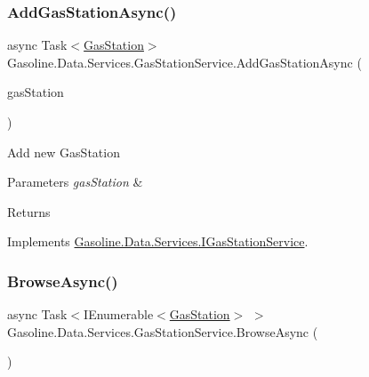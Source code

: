 \subsubsection{\texorpdfstring{AddGasStationAsync()}{AddGasStationAsync()}}
{\footnotesize\ttfamily async Task$<$\mbox{\hyperlink{class_gasoline_1_1_data_1_1_models_1_1_gas_station}{Gas\+Station}}$>$ Gasoline.\+Data.\+Services.\+Gas\+Station\+Service.\+Add\+Gas\+Station\+Async (\begin{DoxyParamCaption}\item[{\mbox{\hyperlink{class_gasoline_1_1_data_1_1_models_1_1_gas_station}{Gas\+Station}}}]{gas\+Station }\end{DoxyParamCaption})}



Add new Gas\+Station 


\begin{DoxyParams}{Parameters}
{\em gas\+Station} & \\
\hline
\end{DoxyParams}
\begin{DoxyReturn}{Returns}

\end{DoxyReturn}


Implements \mbox{\hyperlink{interface_gasoline_1_1_data_1_1_services_1_1_i_gas_station_service_ae0bb2d899701dddd473667980e7533d2}{Gasoline.\+Data.\+Services.\+I\+Gas\+Station\+Service}}.

\mbox{\label{class_gasoline_1_1_data_1_1_services_1_1_gas_station_service_adb5cc988c7237c4019008a3c86bbe25f}} 
\subsubsection{\texorpdfstring{BrowseAsync()}{BrowseAsync()}}
{\footnotesize\ttfamily async Task$<$I\+Enumerable$<$\mbox{\hyperlink{class_gasoline_1_1_data_1_1_models_1_1_gas_station}{Gas\+Station}}$>$ $>$ Gasoline.\+Data.\+Services.\+Gas\+Station\+Service.\+Browse\+Async (\begin{DoxyParamCaption}{ }\end{DoxyParamCaption})}



